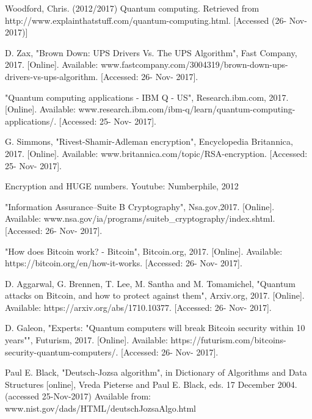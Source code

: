 \documentclass[10pt,journal,compsoc]{IEEEtran}
\begin{document}
\begin{thebibliography}{1}
	Woodford, Chris. (2012/2017) Quantum computing. Retrieved from http://www.explainthatstuff.com/quantum-computing.html. [Accessed (26- Nov- 2017)] 		
	
	D. Zax, "Brown Down: UPS Drivers Vs. The UPS Algorithm", Fast Company, 2017. [Online]. Available: www.fastcompany.com/3004319/brown-down-ups-drivers-vs-ups-algorithm. [Accessed: 26- Nov- 2017].
	

	"Quantum computing applications - IBM Q - US", Research.ibm.com, 2017. [Online]. Available: www.research.ibm.com/ibm-q/learn/quantum-computing-applications/. [Accessed: 25- Nov- 2017].


	
	G. Simmons, "Rivest-Shamir-Adleman encryption", Encyclopedia Britannica, 2017. [Online]. Available: www.britannica.com/topic/RSA-encryption. [Accessed: 25- Nov- 2017].

	
	Encryption and HUGE numbers. Youtube: Numberphile, 2012

	"Information Assurance--Suite B Cryptography", Nsa.gov,2017. [Online]. Available: www.nsa.gov/ia/programs/suiteb\_cryptography/index.shtml. [Accessed: 26- Nov- 2017].

	"How does Bitcoin work? - Bitcoin", Bitcoin.org, 2017. [Online]. Available: https://bitcoin.org/en/how-it-works. [Accessed: 26- Nov- 2017].
	
	D. Aggarwal, G. Brennen, T. Lee, M. Santha and M. Tomamichel, "Quantum attacks on Bitcoin, and how to protect against them", Arxiv.org, 2017. [Online]. Available: https://arxiv.org/abs/1710.10377. [Accessed: 26- Nov- 2017].
	
		
	D. Galeon, "Experts: "Quantum computers will break Bitcoin security within 10 years"", Futurism, 2017. [Online]. Available: https://futurism.com/bitcoins-security-quantum-computers/. [Accessed: 26- Nov- 2017].



	
	
	


	
	Paul E. Black, "Deutsch-Jozsa algorithm", in Dictionary of Algorithms and Data Structures [online], Vreda Pieterse and Paul E. Black, eds. 17 December 2004. (accessed 25-Nov-2017) Available from: www.nist.gov/dads/HTML/deutschJozsaAlgo.html
	

	
	





	
		

	

\end{thebibliography}




\end{document}
